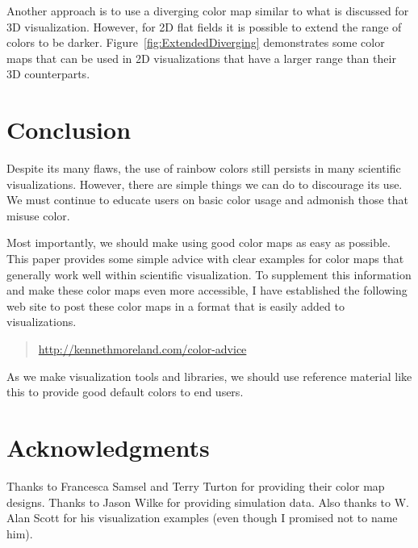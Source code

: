 \documentclass[letterpaper,twocolumn,fleqn]{article}
\newcommand{\fix}[1]{}
\begin{document}
Another approach is to use a diverging color map similar to what is
discussed for 3D visualization. However, for 2D flat fields it is possible
to extend the range of colors to be darker.
Figure~\ref{fig:ExtendedDiverging} demonstrates some color maps that can be
used in 2D visualizations that have a larger range than their 3D
counterparts.




\section{Conclusion}

\noindent
Despite its many flaws, the use of rainbow colors still persists in many
scientific visualizations. However, there are simple things we can do to
discourage its use. We must continue to educate users on basic color usage
and admonish those that misuse color.

Most importantly, we should make using good color maps as easy as possible.
This paper provides some simple advice with clear examples for color maps
that generally work well within scientific visualization. To supplement
this information and make these color maps even more accessible, I have
established the following web site to post these color maps in a format
that is easily added to visualizations.

\begin{quote}
  \url{http://kennethmoreland.com/color-advice}
\end{quote}

\fix{Actually make this web page.}

As we make visualization tools and libraries, we should use reference
material like this to provide good default colors to end users.

\section{Acknowledgments}

\noindent
Thanks to Francesca Samsel and Terry Turton for providing their color map
designs. Thanks to Jason Wilke for providing simulation data. Also thanks
to W. Alan Scott for his visualization examples (even though I promised not
to name him).
\end{document}
